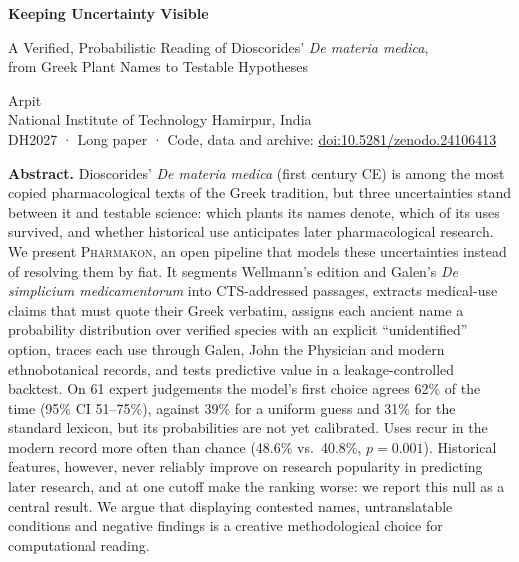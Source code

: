 \documentclass[11pt,a4paper]{article}
\newcommand{\pkm}{\textsc{Pharmakon}}
\begin{document}
\begin{center}
{\sffamily\fontsize{18}{22}\selectfont\bfseries Keeping Uncertainty Visible\par}
\vspace{4pt}
{\sffamily\fontsize{12.5}{16}\selectfont A Verified, Probabilistic Reading of Dioscorides’ \textit{De materia medica},\\ from Greek Plant Names to Testable Hypotheses\par}
\vspace{10pt}
{\large Arpit}\\[2pt]
{\small National Institute of Technology Hamirpur, India}\\[6pt]
{\small\sffamily\color{dim} DH2027 · Long paper · Code, data and archive: \href{https://doi.org/10.5281/zenodo.24106413}{doi:10.5281/zenodo.24106413}}
\end{center}
\vspace{2pt}

\noindent\colorbox{verd!6}{\parbox{\dimexpr\linewidth-2\fboxsep}{\small
\textbf{\sffamily Abstract.}\enspace
Dioscorides’ \textit{De materia medica} (first century CE) is among the most copied pharmacological texts of the Greek tradition, but three uncertainties stand between it and testable science: which plants its names denote, which of its uses survived, and whether historical use anticipates later pharmacological research. We present \pkm{}, an open pipeline that models these uncertainties instead of resolving them by fiat. It segments Wellmann’s edition and Galen’s \textit{De simplicium medicamentorum} into CTS-addressed passages, extracts medical-use claims that must quote their Greek verbatim, assigns each ancient name a probability distribution over verified species with an explicit “unidentified” option, traces each use through Galen, John the Physician and modern ethnobotanical records, and tests predictive value in a leakage-controlled backtest. On 61 expert judgements the model’s first choice agrees 62\% of the time (95\% CI 51–75\%), against 39\% for a uniform guess and 31\% for the standard lexicon, but its probabilities are not yet calibrated. Uses recur in the modern record more often than chance (48.6\% vs.\ 40.8\%, $p = 0.001$). Historical features, however, never reliably improve on research popularity in predicting later research, and at one cutoff make the ranking worse: we report this null as a central result. We argue that displaying contested names, untranslatable conditions and negative findings is a creative methodological choice for computational reading.
}}
\end{document}
